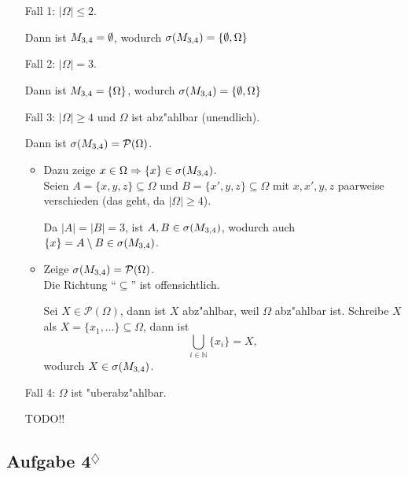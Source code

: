 \documentclass[11pt,a4paper,ngerman]{article}
\newcommand{\set}[1]{ \{ #1 \}}
\newcommand{\N}{\mathbb{N}}
\newcommand{\Rarr}{\Rightarrow}
\newcommand{\Pot}{\mathcal{P}}
\newcommand{\abs}[1]{ |#1|}
\newcommand{\marcel}{$^\diamondsuit$}
\begin{document}
\begin{itemize}
  \item[Fall 1:] $\abs{\Omega} \le 2$.

    Dann ist $M_{3,4} = \emptyset$, wodurch $\sigma(\SetM) = \set{\emptyset,
    \Omega}$

  \item[Fall 2:] $\abs{\Omega} = 3$.

    Dann ist $\SetM = \set{\Omega}$, wodurch $\sigma(\SetM) = \set{\emptyset,
    \Omega}$

  \item[Fall 3:] $\abs{\Omega} \ge 4$ und $\Omega$ ist abz"ahlbar (unendlich).

    Dann ist $\sigma(\SetM) = \Pot(\Omega)$.

    \begin{itemize}
      \item Dazu zeige $x \in \Omega \Rarr \set x \in \sigma(\SetM)$. \\

        Seien $A = \set{x, y, z} \subseteq \Omega$ und $B = \set{x', y, z}
        \subseteq \Omega$ mit $x,x',y,z$ paarweise verschieden (das geht, da
        $\abs{\Omega} \ge 4$).

        Da $\abs{A} = \abs{B} = 3$, ist $A,B \in \sigma(M_{3,4})$, wodurch auch
        $\set x = A\setminus B \in \sigma(\SetM)$.

      \item Zeige $\sigma(\SetM) = \Pot(\Omega)$. \\

        Die Richtung ``$\subseteq$'' ist offensichtlich.

        Sei $X \in \Pot(\Omega)$, dann ist $X$ abz"ahlbar, weil $\Omega$
        abz"ahlbar ist. Schreibe $X$ als $X = \set{x_1, \ldots} \subseteq
        \Omega$, dann ist \[
          \bigcup_{i\in\N} \set{x_i} = X,
        \]
        wodurch $X \in \sigma(M_{3,4})$.

    \end{itemize}

  \item[Fall 4:] $\Omega$ ist "uberabz"ahlbar.

    TODO!!

\end{itemize}

\subsection*{Aufgabe 4\marcel}
\end{document}
